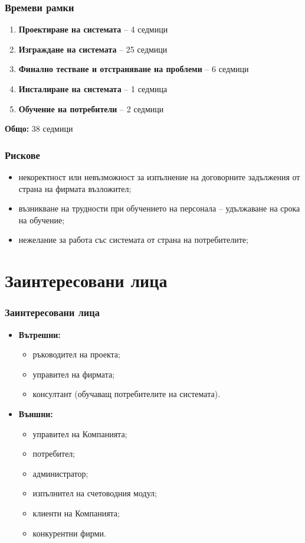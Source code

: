 \documentclass{beamer}
\begin{document}
\begin{frame}
  \frametitle{Времеви рамки}
  \begin{enumerate}
    \item \textbf{Проектиране на системата} – 4 седмици \\
    \item \textbf{Изграждане на системата} – 25 седмици \\
    \item \textbf{Финално тестване и отстраняване на проблеми} – 6 седмици \\
    \item \textbf{Инсталиране на системата} – 1 седмица \\
    \item \textbf{Обучение на потребители} – 2 седмици
  \end{enumerate}
    \textbf{Общо:} 38 седмици 

\end{frame}

\begin{frame}
  \frametitle{Рискове}
  \begin{itemize}
      \item некоректност или невъзможност за изпълнение на договорните задължения от страна на фирмата възложител;
      \item възникване на трудности при обучението на персонала – удължаване на срока на обучение;
      \item нежелание за работа със системата от страна на потребителите;
  \end{itemize}
\end{frame}

\section{Заинтересовани лица}
\begin{frame}
  \frametitle{Заинтересовани лица}
\begin{itemize}
 \item \textbf{Вътрешни:}
     \begin{itemize}
         \item ръководител на проекта;
         \item управител на фирмата;
         \item консултант (обучаващ потребителите на системата).
     \end{itemize}
  \item \textbf{Външни:}
      \begin{itemize}
          \item управител на Компанията;
          \item потребител;
          \item администратор;
          \item изпълнител на счетоводния модул;
          \item клиенти на Компанията;
          \item конкурентни фирми.
      \end{itemize}
\end{itemize}
\end{frame}
\end{document}
